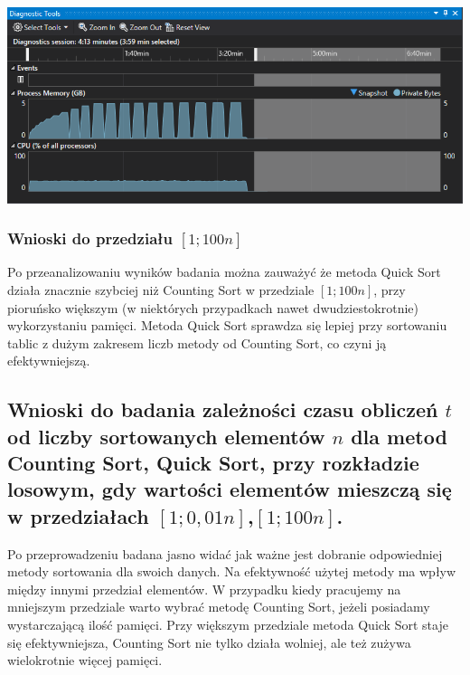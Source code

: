 \documentclass[polish,polish,a4paper]{article}
\begin{document}
\begin{spacing}{1.5}
\begin{minipage}[H]{\textwidth}
	\begin{center}
		\includegraphics[scale=0.85]{zad4pamiec100n.png}
		\label{fig:zad4pamiec100n}
	\end{center}
\end{minipage}



\subsubsection{Wnioski do przedziału $[1;100n]$}

Po przeanalizowaniu wyników badania można zauważyć że metoda Quick Sort działa znacznie szybciej niż Counting Sort w przedziale $[1;100n]$, przy pioruńsko większym (w niektórych przypadkach nawet dwudziestokrotnie) wykorzystaniu pamięci. Metoda Quick Sort sprawdza się lepiej przy sortowaniu tablic z dużym zakresem liczb metody od Counting Sort, co czyni ją efektywniejszą.


\subsection{Wnioski do badania zależności czasu obliczeń $t$ od liczby sortowanych elementów $n$ dla metod Counting Sort, Quick Sort, przy rozkładzie losowym, gdy wartości elementów mieszczą się w przedziałach  $ [1;0,01n] $,$ [1;100n] $. }

Po przeprowadzeniu badana jasno widać jak ważne jest dobranie odpowiedniej metody sortowania dla swoich danych. Na efektywność użytej metody ma wpływ między innymi przedział elementów. W przypadku kiedy pracujemy na mniejszym przedziale warto wybrać metodę Counting Sort, jeżeli posiadamy wystarczającą ilość pamięci. Przy większym przedziale metoda Quick Sort staje się efektywniejsza, Counting Sort nie tylko działa wolniej, ale też zużywa wielokrotnie więcej pamięci.
	

	
\end{spacing}
	\newpage
	\tableofcontents
\end{document}
